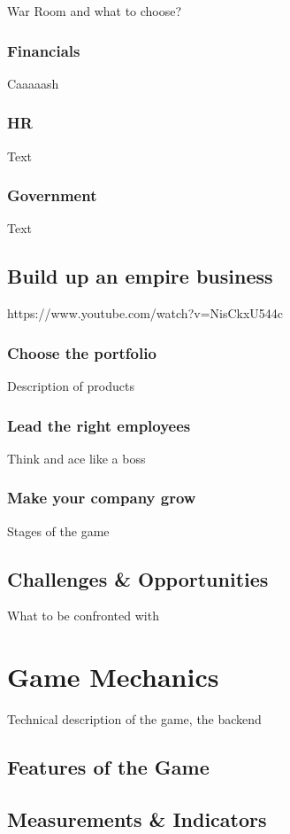 \documentclass[11pt,titlepage,oneside,openany]{book}
\begin{document}
War Room and what to choose?
\subsection{Financials}
Caaaaash
\subsection{HR}
Text
\subsection{Government}
Text

\section{Build up an empire business}
\label{sec:business}
https://www.youtube.com/watch?v=NisCkxU544c
\subsection{Choose the portfolio}

Description of products

\subsection{Lead the right employees}

Think and ace like a boss

\subsection{Make your company grow}
Stages of the game


\section{Challenges \& Opportunities}
\label{sec:evil}


What to be confronted with 
\chapter{Game Mechanics}
\label{cha:alg}
Technical description of the game, the backend
\section{Features of the Game}
\label{sec:comp-good}

\section{Measurements \& Indicators}
\label{sec:diag}
\end{document}
